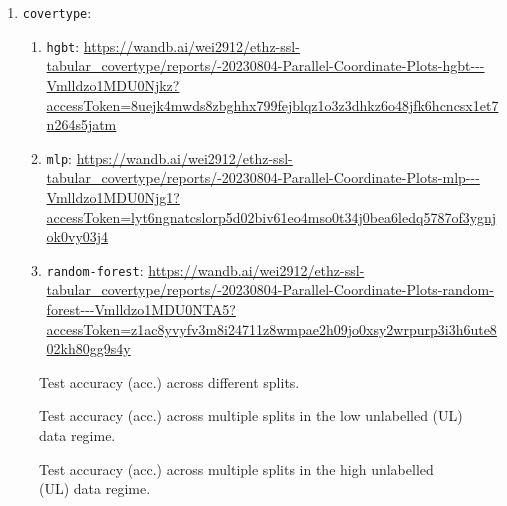 \documentclass{article}
\begin{document}
{\begin{enumerate}
\begin{enumerate}
    \end{enumerate}
    \item \texttt{covertype}: \begin{enumerate}
      \item \texttt{hgbt}: \url{https://wandb.ai/wei2912/ethz-ssl-tabular_covertype/reports/-20230804-Parallel-Coordinate-Plots-hgbt---Vmlldzo1MDU0Njkz?accessToken=8uejk4mwds8zbghhx799fejblqz1o3z3dhkz6o48jfk6hcncsx1et7n264s5jatm}
      \item \texttt{mlp}: \url{https://wandb.ai/wei2912/ethz-ssl-tabular_covertype/reports/-20230804-Parallel-Coordinate-Plots-mlp---Vmlldzo1MDU0Njg1?accessToken=lyt6ngnatcslorp5d02biv61eo4mso0t34j0bea6ledq5787of3ygnjok0vy03j4}
      \item \texttt{random-forest}: \url{https://wandb.ai/wei2912/ethz-ssl-tabular_covertype/reports/-20230804-Parallel-Coordinate-Plots-random-forest---Vmlldzo1MDU0NTA5?accessToken=z1ac8yvyfv3m8i24711z8wmpae2h09jo0xsy2wrpurp3i3h6ute802kh80gg9s4y}
    \end{enumerate}
  \end{enumerate}
}

\begin{figure}[htbp]
  \centering
  
  
  
  
  \caption{Test accuracy (acc.) across different splits.}
  \label{fig:ul_split_vs_l_split}
\end{figure}

\begin{figure}[htbp]
  \centering
  
  
  
  
  \caption{
    Test accuracy (acc.) across multiple splits in the low unlabelled (UL) data regime.
  }
  \label{fig:test_acc_vs_ul_split_low}
\end{figure}

\begin{figure}[htbp]
  \centering
  
  
  
  
  \caption{
    Test accuracy (acc.) across multiple splits in the high unlabelled (UL) data regime.
  }
  \label{fig:test_acc_vs_ul_split_high}
\end{figure}
\end{document}
